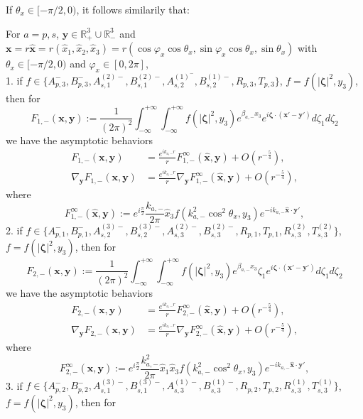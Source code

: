 \documentclass[final,reqno]{siamltex}
\newcommand{\mat}{\mathbb}
\newcommand{\R}{{\mat R}}
\begin{document}
If $\theta_x\in[-\pi/2,0)$, it follows similarily that: 
\begin{theorem}\label{thm3.8}
	For $a=p,s$, $\mathbf{y}\in\R^3_+\cup\R^3_-$ and $\mathbf{x}=r\mathbf{\hat x}=r(\hat x_1,\hat x_2,\hat x_3)=r(\cos\varphi_x\cos\theta_x,\sin\varphi_x\cos\theta_x,\sin\theta_x)$ with $\theta_x\in[-\pi/2,0)$ and $\varphi_x\in[0,2\pi]$, \\ 
	1. if $f\in\{A_{p,3}^-,B_{p,3}^-,A_{s,1}^{(2)-},B_{s,1}^{(2)-},A_{s,2}^{(1)^-},B_{s,2}^{(1)-},R_{p,3},T_{p,3}\}$, $f=f(|\boldsymbol{\zeta}|^2,y_3)$,  then for 
	$$
	F_{1,-}(\mathbf{x},\mathbf{y}):=\frac{1}{(2\pi)^2}\int_{-\infty}^{+\infty}\int_{-\infty}^{+\infty}f(|\boldsymbol{\zeta}|^2,y_3)e^{\beta_{a,-}x_3}e^{i\boldsymbol{\zeta}\cdot(\mathbf{x}'-\mathbf{y}')}d\zeta_1d\zeta_2
	$$
	we have the asymptotic behaviors 
	\begin{align*}
	F_{1,-}(\mathbf{x},\mathbf{y})&=\frac{e^{ik_{a,-}r}}{r}F_{1,-}^\infty(\hat{\mathbf{x}},\mathbf{y})+O(r^{-\frac{5}{4}}), \\ 
	\nabla_{\mathbf{y}}F_{1,-}(\mathbf{x},\mathbf{y})&=\frac{e^{ik_{a,-}r}}{r}\nabla_{\mathbf{y}}F_{1,-}^\infty(\hat{\mathbf{x}},\mathbf{y})+O(r^{-\frac{5}{4}}), 
	\end{align*}
	where 
	$$
	F_{1,-}^\infty(\hat{\mathbf{x}},\mathbf{y}):=e^{i\frac{\pi}{2}}\frac{k_{a,-}}{2\pi}\hat x_3f(k_{a,-}^2\cos^2\theta_x,y_3)e^{-ik_{a,-}\hat{\mathbf{x}}\cdot\mathbf{y}'}, 
	$$
	2. if $f\in\{A_{p,1}^-,B_{p,1}^-,A_{s,2}^{(3)-},B_{s,2}^{(3)-},A_{s,3}^{(2)-},B_{s,3}^{(2)-},R_{p,1},T_{p,1},R_{s,3}^{(2)},T_{s,3}^{(2)}\}$, $f=f(|\boldsymbol{\zeta}|^2,y_3)$,  then for 
	$$
	F_{2,-}(\mathbf{x},\mathbf{y}):=\frac{1}{(2\pi)^2}\int_{-\infty}^{+\infty}\int_{-\infty}^{+\infty}f(|\boldsymbol{\zeta}|^2,y_3)e^{\beta_{a,-}x_3}\zeta_1e^{i\boldsymbol{\zeta}\cdot(\mathbf{x}'-\mathbf{y}')}d\zeta_1d\zeta_2
	$$
	we have the asymptotic behaviors 
	\begin{align*}
	F_{2,-}(\mathbf{x},\mathbf{y})&=\frac{e^{ik_{a,-}r}}{r}F_{2,-}^\infty(\hat{\mathbf{x}},\mathbf{y})+O(r^{-\frac{5}{4}}), \\ 
	\nabla_{\mathbf{y}}F_{2,-}(\mathbf{x},\mathbf{y})&=\frac{e^{ik_{a,-}r}}{r}\nabla_{\mathbf{y}}F_{2,-}^\infty(\hat{\mathbf{x}},\mathbf{y})+O(r^{-\frac{5}{4}}), 
	\end{align*}
	where 
	$$
	F_{2,-}^\infty(\hat{\mathbf{x}},\mathbf{y}):=e^{i\frac{\pi}{2}}\frac{k_{a,-}^2}{2\pi}\hat x_1\hat x_3f(k_{a,-}^2\cos^2\theta_x,y_3)e^{-ik_{a,-}\hat{\mathbf{x}}\cdot\mathbf{y}'}, 
	$$
	3. if $f\in\{A_{p,2}^-,B_{p,2}^-,A_{s,1}^{(3)-},B_{s,1}^{(3)-},A_{s,3}^{(1)-},B_{s,3}^{(1)-},R_{p,2},T_{p,2},R_{s,3}^{(1)},T_{s,3}^{(1)}\}$, $f=f(|\boldsymbol{\zeta}|^2,y_3)$,  then for 

\end{theorem}
\end{document}
